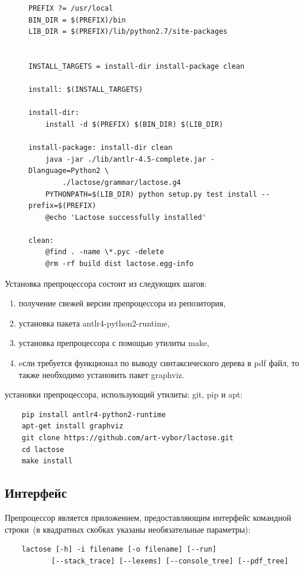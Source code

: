 \documentclass[12pt,a4paper,oneside]{extarticle}
\begin{document}
        \begin{figure}[h!]  
            \begin{lstlisting}[label={lst:makefile},caption={Cкрипт конфигурации для утилиты make},captionpos=b]
PREFIX ?= /usr/local
BIN_DIR = $(PREFIX)/bin
LIB_DIR = $(PREFIX)/lib/python2.7/site-packages


INSTALL_TARGETS = install-dir install-package clean

install: $(INSTALL_TARGETS)

install-dir:
    install -d $(PREFIX) $(BIN_DIR) $(LIB_DIR)

install-package: install-dir clean
    java -jar ./lib/antlr-4.5-complete.jar -Dlanguage=Python2 \
        ./lactose/grammar/lactose.g4
    PYTHONPATH=$(LIB_DIR) python setup.py test install --prefix=$(PREFIX)
    @echo 'Lactose successfully installed'

clean:
    @find . -name \*.pyc -delete
    @rm -rf build dist lactose.egg-info

            \end{lstlisting}
        \end{figure}

        \noindent Установка препроцессора состоит из следующих шагов:
        \begin{enumerate}
                \item получение свежей версии препроцессора из репозитория,
                \item установка пакета antlr4-python2-runtime,
                \item установка препроцессора с помощью утилиты make,
                \item eсли требуется функционал по выводу синтаксического дерева в pdf файл, то также необходимо установить пакет graphviz.
        \end{enumerate}

         установки препроцессора, использующий утилиты: git, pip и apt:  
        \begin{lstlisting}
    pip install antlr4-python2-runtime
    apt-get install graphviz
    git clone https://github.com/art-vybor/lactose.git
    cd lactose
    make install
        \end{lstlisting}
    \clearpage
    
    \subsection{Интерфейс}
        Препроцессор является приложением, предоставляющим интерфейс командной строки~(в квадратных скобках указаны необязательные параметры):
        \begin{lstlisting}        
    lactose [-h] -i filename [-o filename] [--run]
           [--stack_trace] [--lexems] [--console_tree] [--pdf_tree]
        \end{lstlisting}
\end{document}

